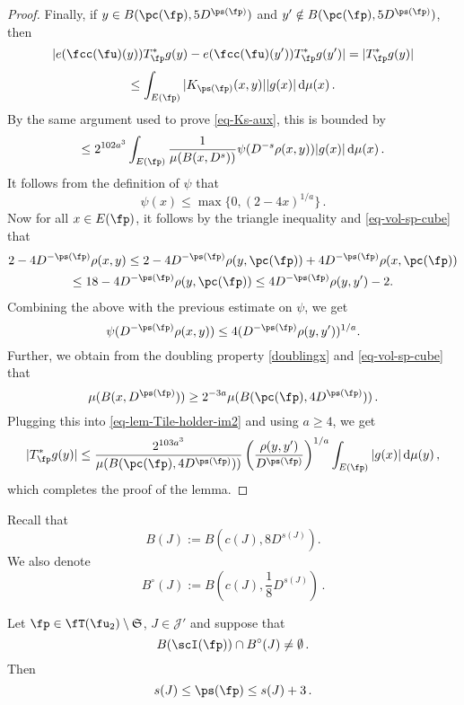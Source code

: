 \begin{proof}
        Finally, if $y \in B(\pc(\fp), 5D^{\ps(\fp)})$ and $y' \notin B(\pc(\fp), 5D^{\ps(\fp)})$, then
        $$
            |e(\fcc(\fu)(y)) T_{\fp}^* g(y) - e(\fcc(\fu)(y')) T_{\fp}^* g(y')| = |T_{\fp}^* g(y)|
        $$
        $$
            \le \int_{E(\fp)} |K_{\ps(\fp)}(x,y)| |g(x)| \, \mathrm{d}\mu(x)\,.
        $$
        By the same argument used to prove \eqref{eq-Ks-aux}, this is bounded by
      \begin{equation}
            \label{eq-lem-Tile-holder-im2}
            \le 2^{102a^3} \int_{E(\fp)} \frac{1}{\mu(B(x, D^s))} \psi(D^{-s} \rho(x,y)) |g(x)| \, \mathrm{d}\mu(x)\,.
        \end{equation}
        It follows from the definition of $\psi$ that
        $$
            \psi(x) \le \max\{0, (2 - 4x)^{1/a}\}\,.
        $$
        Now for all $x\in E(\fp)$, it follows by the triangle inequality and \eqref{eq-vol-sp-cube} that
        \begin{multline*}
        2 - 4D^{-\ps(\fp)}\rho(x,y)\leq 2 - 4D^{-\ps(\fp)}\rho(y, \pc(\fp)) + 4 D^{-\ps(\fp)}\rho(x, \pc(\fp))\\\leq 18 - 4 D^{-\ps(\fp)} \rho(y, \pc(\fp)) \leq 4 D^{-\ps(\fp)}\rho(y,y') - 2 .
        \end{multline*}
        Combining the above with the previous estimate on $\psi$, we get
        $$
            \psi(D^{-\ps(\fp)}\rho(x,y)) \le 4 (D^{-\ps(\fp)}\rho(y,y'))^{1/a}.
        $$
        Further, we obtain from the doubling property \eqref{doublingx} and \eqref{eq-vol-sp-cube} that
        $$
            \mu(B(x, D^{\ps(\fp)})) \ge 2^{-3a} \mu(B(\pc(\fp), 4D^{\ps(\fp)}))\,.
        $$
        Plugging this into \eqref{eq-lem-Tile-holder-im2} and using $a \ge 4$, we get
        $$
            |T_{\fp}^* g(y)| \le \frac{2^{103a^3}}{\mu(B(\pc(\fp), 4D^{\ps(\fp)}))} \left(\frac{\rho(y,y')}{D^{\ps(\fp)}}\right)^{1/a} \int_{E(\fp)} |g(x)| \, \mathrm{d}\mu(y)\,,
        $$
        which completes the proof of the lemma.
    \end{proof}

    Recall that
    \begin{equation*}
        B(J) := B(c(J), 8D^{s(J)}).
    \end{equation*}
    We also denote
    \begin{equation*}
     B^\circ{}(J) := B(c(J), \frac{1}{8}D^{s(J)})\, .
    \end{equation*}


    \begin{lemma}
        \label{limited-scale-impact}
        \leanok
        Let $\fp \in \fT(\fu_2) \setminus \mathfrak{S}$, $J \in \mathcal{J}'$ and suppose that
        $$
           B(\scI(\fp)) \cap B^\circ(J) \ne \emptyset\,.
        $$
        Then
        $$
            s(J) \le \ps(\fp) \le s(J) +3\,.
        $$
    \end{lemma}

